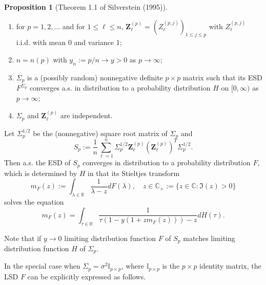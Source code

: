 \documentclass[a4paper,11pt]{article}
\theoremstyle{plain}
\theoremstyle{definition}
\newtheorem{prps}[thm]{Proposition}
\newcommand{\MR}{\mathbb{R}}
\begin{document}
	\begin{prps} [Theorem 1.1 of Silverstein (1995)] \label{MP law} \
		\begin{enumerate}
			\item for $p = 1, 2, \dots$ and for $1 \leq \ell \leq n$, $\mathbf{Z}_\ell^{(p)} = (Z_\ell^{(p,j)})_{1 \leq j \leq p}$ with $Z_\ell^{(p,j)}$ i.i.d. with mean 0 and variance 1;
			\item $n = n(p)$ with $y_n := p/n \rightarrow y > 0$ as $p \rightarrow \infty$;
			\item $\Sigma_p$ is a (possibly random) nonnegative definite $p \times p$ matrix such that its ESD $F^{\Sigma_p}$ converges a.s. in distribution to a probability distribution $H$ on $[0,\infty)$ as $p \rightarrow \infty$;
			\item $\Sigma_p$ and $\mathbf{Z}_\ell^{(p)}$ are independent.
		\end{enumerate}
		Let $\Sigma_p^{1/2}$ be the (nonnegative) square root matrix of $\Sigma_p$ and 
		\[S_p:= \frac{1}{n} \sum_{\ell=1}^{n} \Sigma_p^{1/2} \mathbf{Z}_\ell^{(p)}(\mathbf{Z}_\ell^{(p)})^T \Sigma_p^{1/2}.\]
		Then a.s. the ESD of $S_p$ converges in distribution to a probability distribution $F$, which is determined by $H$ in that its Stieltjes transform
		\[ m_F(z):=\int_{\lambda \in \MR} \frac{1}{\lambda - z} dF(\lambda), \quad z \in \mathbb{C}_+ := \{ z \in \mathbb{C} : \Im(z)>0 \} \]
		solves the equation
		\begin{equation}
		m_F(z) = \int_{\tau \in \MR} \frac{1}{\tau (1-y(1+zm_F(z))) - z } dH(\tau).
		\end{equation}
	\end{prps}
	
	Note that if $y \rightarrow 0$ limiting distribution function $F$ of $S_p$ matches limiting distribution function $H$ of $\Sigma_p$.
	
	In the special case when $\Sigma_p = \sigma^2 \mathbb{I}_{p \times p}$, where $\mathbb{I}_{p \times p}$ is the $p \times p$ identity matrix, the LSD $F$ can be explicitly expressed as follows.
	
\end{document}
